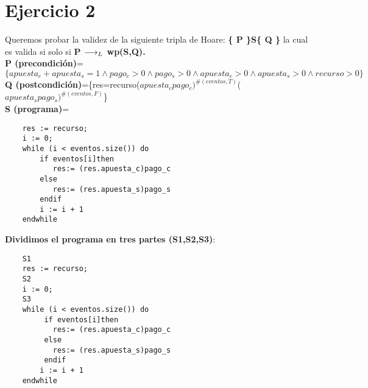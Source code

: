 \documentclass[10pt,a4paper]{article}
\begin{document}
\section{Ejercicio 2}
\begin{flushleft}
Queremos probar  la validez de la siguiente tripla de Hoare:
\textbf{\{ P \}S\{ Q \}} la cual es valida si solo si \textbf{{P $\longrightarrow _L$ wp(S,Q)}.}\\                                  
\vspace{3mm}
\textbf{P (precondición)}=$\{ apuesta_c + apuesta_s =1 \wedge pago_c>0 \wedge pago_s>0 \wedge apuesta_c>0 \wedge apuesta_s>0 \wedge recurso>0\}$\\
\vspace{3mm}
\textbf{Q (postcondición)}=\{res=recurso($apuesta_cpago_c)^{\#(eventos,T)}$($apuesta_spago_s)^{\#(eventos,F)}$\}\\
\vspace{34mm}
\textbf{S (programa)}=
\begin{lstlisting}
	res := recurso;
	i := 0;
	while (i < eventos.size()) do
	    if eventos[i]then
		   res:= (res.apuesta_c)pago_c
		else
		   res:= (res.apuesta_s)pago_s
		endif
		i := i + 1
	endwhile
		\end{lstlisting} 

\vspace{3mm}
\textbf{Dividimos el programa en tres partes (S1,S2,S3)}:\\
\begin{lstlisting}
	S1
	res := recurso;
	S2
	i := 0;
	S3
	while (i < eventos.size()) do
	     if eventos[i]then
		   res:= (res.apuesta_c)pago_c
		 else
		   res:= (res.apuesta_s)pago_s
		 endif
		i := i + 1
	endwhile
		\end{lstlisting} 


\end{flushleft}
\end{document}
